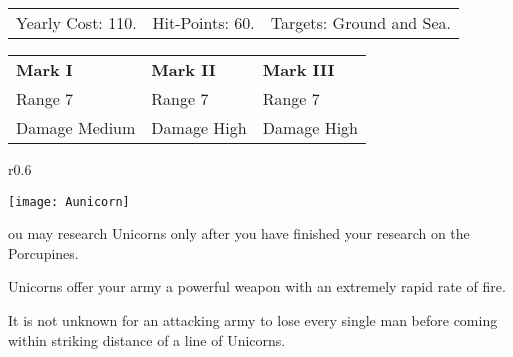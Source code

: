 
\begin{tabular}{p{1.264in} p{1.264in} p{1.264in}}
    Yearly Cost: 110. & Hit-Points: 60. & Targets: Ground and Sea.
\end{tabular}

\begin{tabular}{|p{1.264in} p{1.264in} p{1.264in}|}
    \hline
    \textbf{Mark I}    & \textbf{Mark II} & \textbf{Mark III} \\ 
    Range 7    & Range 7 & Range 7 \\ 
    Damage Medium & Damage High & Damage High \\ 
    \hline
\end{tabular}

\begin{wrapfigure}{r}{0.6\textwidth}
    \vspace{-20pt}
    \begin{center}
        \texttt{[image: Aunicorn]} %
    \end{center}
    \vspace{-20pt}
\end{wrapfigure}

ou may research Unicorns only after you have finished your research on the Porcupines.

Unicorns offer your army a powerful weapon with an extremely rapid rate of fire.

It is not unknown for an attacking army to lose every single man before coming within striking distance of a line of Unicorns.